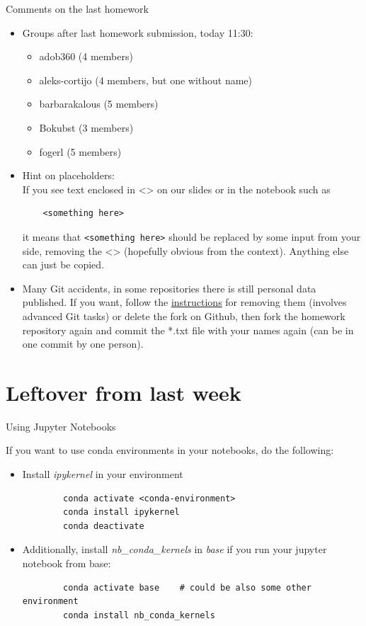 \begin{frame}[fragile]{Comments on the last homework}
	\begin{itemize}
        \item Groups after last homework submission, today 11:30:
	        \begin{itemize}
                \item adob360 (4 members)
                \item aleks-cortijo  (4 members, but one without name)
                \item barbarakalous (5 members)
                \item Bokubst (3 members)
                \item fogerl (5 members)
	        \end{itemize}\pause
        \item Hint on placeholders:\\
	        If you see text enclosed in <> on our slides or in the notebook such as
	\begin{verbatim}
	<something here>
	\end{verbatim}
	it means that \verb|<something here>| should be replaced by some input from your side, removing
    the <> (hopefully obvious from the context). Anything else can just be copied.\pause
        \item Many Git accidents, in some repositories there is still personal data published. If
            you want, follow the
            \href{https://anchor.host/removing-sensitive-data-from-git-repos/}{instructions} for
            removing them (involves advanced Git tasks) or delete the fork on Github, then fork
            the homework repository again and commit the *.txt file with your names again (can be
            in one commit by one person).
	\end{itemize}
\end{frame}


\section{Leftover from last week}

\begin{frame}[fragile]{Using Jupyter Notebooks}

	If you want to use conda environments in your notebooks, do the following:
	\begin{itemize}
		\item Install \textit{ipykernel} in your environment

		\begin{verbatim}
		conda activate <conda-environment>
		conda install ipykernel
		conda deactivate
		\end{verbatim}
		\item Additionally, install \textit{nb\_conda\_kernels} in \textit{base} if you run your jupyter notebook from base:
		\begin{verbatim}
		conda activate base    # could be also some other environment
		conda install nb_conda_kernels
		\end{verbatim}
	\end{itemize}
\end{frame}


